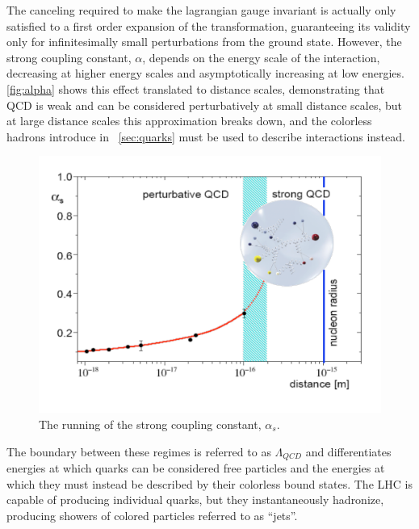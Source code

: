 The canceling required to make the lagrangian gauge invariant is actually only satisfied to a first order expansion of the transformation, guaranteeing its validity only for infinitesimally small perturbations from the ground state. However, the strong coupling constant, $\alpha$, depends on the energy scale of the interaction, decreasing at higher energy scales and asymptotically increasing at low energies. \autoref{fig:alpha} shows this effect translated to distance scales, demonstrating that QCD is weak and can be considered perturbatively at small distance scales, but at large distance scales this approximation breaks down, and the colorless hadrons introduce in ~\autoref{sec:quarks} must be used to describe interactions instead. 

\begin{centering}
\begin{figure}[!htb]
\myfloatalign
\includegraphics[width=.85\linewidth]{figures/theory/strong_coupling.png}
\caption{The running of the strong coupling constant, $\alpha_s$. \cite{Messchendorp:2013ysj}}
\label{fig:alpha}
\end{figure}
\end{centering}

The boundary between these regimes is referred to as $\Lambda_{QCD}$ and differentiates energies at which quarks can be considered free particles and the energies at which they must instead be described by their colorless bound states. The \ac{LHC} is capable of producing individual quarks, but they instantaneously hadronize, producing showers of colored particles referred to as ``jets''. 



